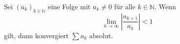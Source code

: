Sei $(a_k)_{k \in \mathbb{N}}$ eine Folge mit $a_k \neq 0$ für alle $k \in \mathbb{N}$. Wenn
$$\lim_{k \to \infty} \left| \frac{a_{k+1}}{a_k} \right| < 1$$
gilt, dann konvergiert $\sum a_k$ absolut.